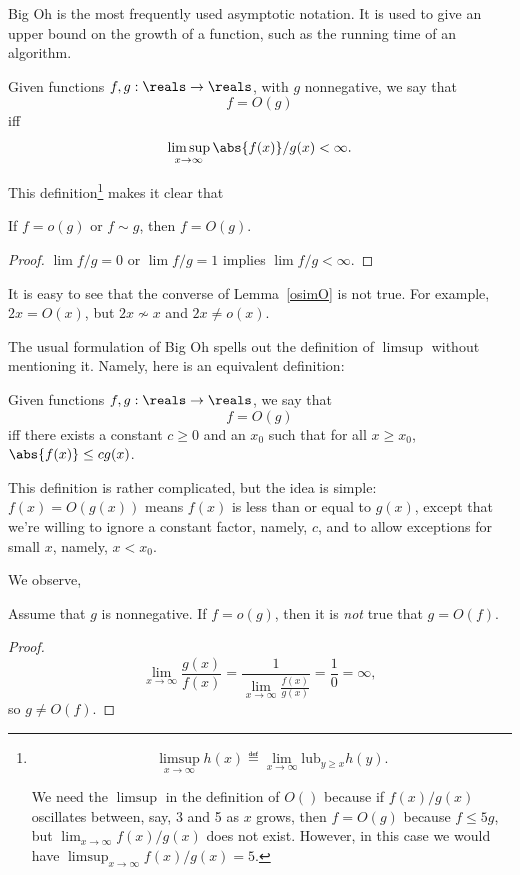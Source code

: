 Big Oh is the most frequently used asymptotic notation.  It is used to
give an upper bound on the growth of a function, such as the running
time of an algorithm.
\begin{definition}
Given functions $f, g : \reals \to \reals$, with $g$ nonnegative, we
say that
\[
f = O(g)
\]
iff
\[
\limsup_{x \rightarrow \infty} \abs{f(x)}/g(x) < \infty.
\]
\end{definition}
This definition\footnote{
\[
\limsup_{x \rightarrow \infty} h(x) \eqdef \lim_{x \rightarrow \infty}
\text{lub}_{y \geq x} h(y).
\]

\noindent We need the $\limsup$ in the definition of $O()$ because if $f(x)/g(x)$
oscillates between, say, 3 and 5 as $x$ grows, then $f = O(g)$ because $f
\leq 5g$, but $\lim_{x \rightarrow \infty} f(x)/g(x)$ does not exist.
However, in this case we would have $\limsup_{x \rightarrow \infty}
f(x)/g(x) = 5$.} makes it clear that
\begin{lemma}\label{osimO}
If $f = o(g)$ or $f \sim g$, then $f = O(g)$.
\end{lemma}
\begin{proof}
$\lim f/g=0$ or $\lim f/g=1$ implies $\lim f/g<\infty$.
\end{proof}

It is easy to see that the converse of Lemma~\ref{osimO} is not true.  For
example, $2x = O(x)$, but $2x \not\sim x$ and $2x \neq o(x)$.


The usual formulation of Big Oh spells out the definition of $\limsup$
without mentioning it.  Namely, here is an equivalent definition:
\begin{definition}
Given functions $f, g : \reals \to \reals$, we say that
\[
f = O(g)
\]
iff there exists a constant $c \geq 0$ and an $x_0$ such that for all $x \geq
x_0$, $\abs{f(x)} \leq c g(x)$.
\end{definition}

This definition is rather complicated, but the idea is simple: $f(x) =
O(g(x))$ means $f(x)$ is less than or equal to $g(x)$, except that we're
willing to ignore a constant factor, namely, $c$, and to allow exceptions for
small $x$, namely, $x < x_0$.

We observe,
\begin{lemma}
Assume that $g$ is nonnegative.
If $f = o(g)$, then it is \emph{not} true that $g = O(f)$.
\end{lemma}
\begin{proof}
\[
\lim_{x \rightarrow \infty} \frac{g(x)}{f(x)} =
 \frac{1}{\lim_{x \rightarrow \infty} \frac{f(x)}{g(x)}} =
 \frac{1}{0} = \infty,
\]
so $g \neq O(f)$.

\end{proof}

